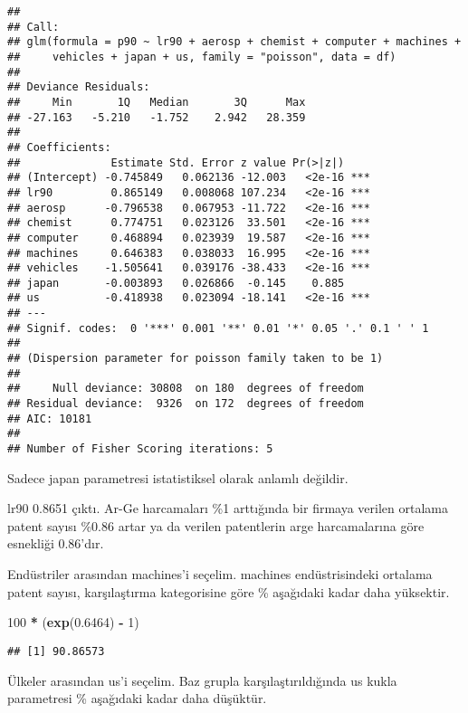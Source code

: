 \documentclass[
]{book}
\newenvironment{Shaded}{\begin{snugshade}}{\end{snugshade}}
\newcommand{\DecValTok}[1]{\textcolor[rgb]{0.00,0.00,0.81}{#1}}
\newcommand{\FloatTok}[1]{\textcolor[rgb]{0.00,0.00,0.81}{#1}}
\newcommand{\KeywordTok}[1]{\textcolor[rgb]{0.13,0.29,0.53}{\textbf{#1}}}
\newcommand{\NormalTok}[1]{#1}
\newcommand{\OperatorTok}[1]{\textcolor[rgb]{0.81,0.36,0.00}{\textbf{#1}}}
\newcommand{\StringTok}[1]{\textcolor[rgb]{0.31,0.60,0.02}{#1}}
\begin{document}
\begin{verbatim}
## 
## Call:
## glm(formula = p90 ~ lr90 + aerosp + chemist + computer + machines + 
##     vehicles + japan + us, family = "poisson", data = df)
## 
## Deviance Residuals: 
##     Min       1Q   Median       3Q      Max  
## -27.163   -5.210   -1.752    2.942   28.359  
## 
## Coefficients:
##              Estimate Std. Error z value Pr(>|z|)    
## (Intercept) -0.745849   0.062136 -12.003   <2e-16 ***
## lr90         0.865149   0.008068 107.234   <2e-16 ***
## aerosp      -0.796538   0.067953 -11.722   <2e-16 ***
## chemist      0.774751   0.023126  33.501   <2e-16 ***
## computer     0.468894   0.023939  19.587   <2e-16 ***
## machines     0.646383   0.038033  16.995   <2e-16 ***
## vehicles    -1.505641   0.039176 -38.433   <2e-16 ***
## japan       -0.003893   0.026866  -0.145    0.885    
## us          -0.418938   0.023094 -18.141   <2e-16 ***
## ---
## Signif. codes:  0 '***' 0.001 '**' 0.01 '*' 0.05 '.' 0.1 ' ' 1
## 
## (Dispersion parameter for poisson family taken to be 1)
## 
##     Null deviance: 30808  on 180  degrees of freedom
## Residual deviance:  9326  on 172  degrees of freedom
## AIC: 10181
## 
## Number of Fisher Scoring iterations: 5
\end{verbatim}

Sadece japan parametresi istatistiksel olarak anlamlı değildir.

lr90 0.8651 çıktı. Ar-Ge harcamaları \%1 arttığında bir firmaya verilen ortalama patent sayısı \%0.86 artar ya da verilen patentlerin arge harcamalarına göre esnekliği 0.86'dır.

Endüstriler arasından machines'i seçelim. machines endüstrisindeki ortalama patent sayısı, karşılaştırma kategorisine göre \% aşağıdaki kadar daha yüksektir.

\begin{Shaded}
\begin{Highlighting}[]
\DecValTok{100} \OperatorTok{*}\StringTok{ }\NormalTok{(}\KeywordTok{exp}\NormalTok{(}\FloatTok{0.6464}\NormalTok{) }\OperatorTok{-}\StringTok{ }\DecValTok{1}\NormalTok{)}
\end{Highlighting}
\end{Shaded}

\begin{verbatim}
## [1] 90.86573
\end{verbatim}

Ülkeler arasından us'i seçelim. Baz grupla karşılaştırıldığında us kukla parametresi \% aşağıdaki kadar daha düşüktür.
\end{document}
